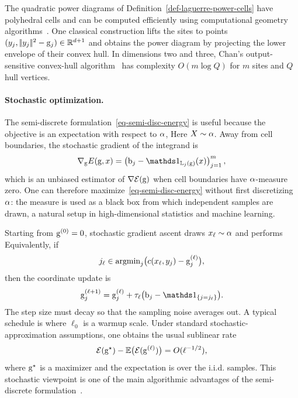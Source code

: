The quadratic power diagrams of Definition~\ref{def-laguerre-power-cells} have polyhedral cells and can be computed efficiently using computational geometry algorithms~\cite{aurenhammer1987power,AurenhammerHA98,Merigot11}. One classical construction lifts the sites to points $(y_j,|\!| y_j |\!|^2-\mathrm{g}_j)\in\mathbb{R}^{d+1}$ and obtains the power diagram by projecting the lower envelope of their convex hull. In dimensions two and three, Chan's output-sensitive convex-hull algorithm~\cite{chan1996optimal} has complexity $O(m\log Q)$ for $m$ sites and $Q$ hull vertices.

\paragraph{Stochastic optimization.}

The semi-discrete formulation~\eqref{eq-semi-disc-energy} is useful because the objective is an expectation with respect to $\alpha$,
Here $X\sim\alpha$. Away from cell boundaries, the stochastic gradient of the integrand is
\[
	\nabla_{\gD}E(\gD,x)
	=
	\left(\b_j-\ones_{\Laguerre_j(\gD)}(x)\right)_{j=1}^m,
\]
which is an unbiased estimator of $\nabla\mathcal{E}(\mathrm{g})$ when cell boundaries have $\alpha$-measure zero. One can therefore maximize~\eqref{eq-semi-disc-energy} without first discretizing $\alpha$: the measure is used as a black box from which independent samples are drawn, a natural setup in high-dimensional statistics and machine learning.

Starting from $\mathrm{g}^{(0)}=0$, stochastic gradient ascent draws $x_\ell\sim\alpha$ and performs
Equivalently, if
\[
	j_\ell\in\operatorname{argmin}_j\bigl(c(x_\ell,y_j)-\mathrm{g}_j^{(\ell)}\bigr),
\]
then the coordinate update is
\[
	\gD_j^{(\ell+1)}
	=
	\gD_j^{(\ell)}
	+
	\tau_\ell\bigl(\b_j-\ones_{\{j=j_\ell\}}\bigr).
\]
The step size must decay so that the sampling noise averages out. A typical schedule is
where $\ell_0$ is a warmup scale. Under standard stochastic-approximation assumptions, one obtains the usual sublinear rate
\[
	\mathcal{E}(\mathrm{g}^\star)-\mathbb{E}\big(\mathcal{E}(\mathrm{g}^{(\ell)})\big)
	=
	O(\ell^{-1/2}),
\]
where $\mathrm{g}^\star$ is a maximizer and the expectation is over the i.i.d. samples. This stochastic viewpoint is one of the main algorithmic advantages of the semi-discrete formulation~\cite{Merigot11,genevay2016stochastic}.

